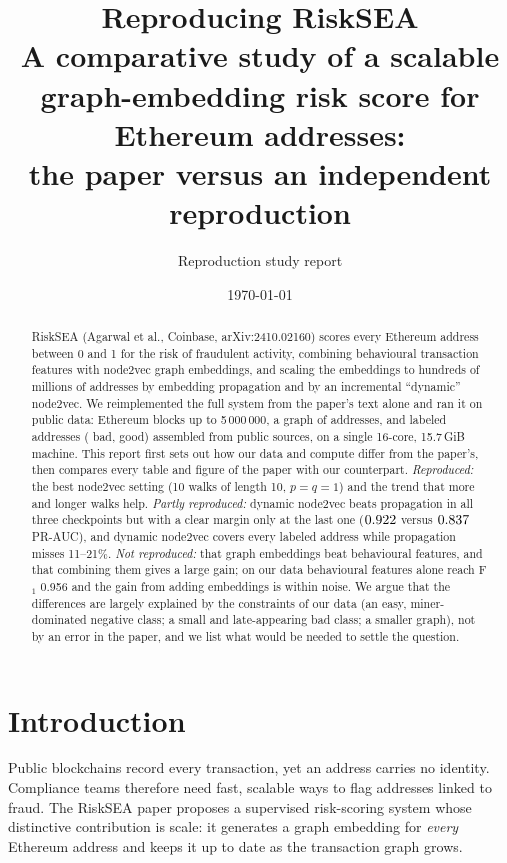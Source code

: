 \documentclass[11pt,a4paper]{article}
\title{\textbf{Reproducing RiskSEA}\\[2pt]\large A comparative study of a scalable graph-embedding risk score for Ethereum addresses:\\ the paper versus an independent reproduction}
\author{Reproduction study report}
\date{\today}
\begin{document}
\maketitle

\begin{abstract}
\noindent
RiskSEA (Agarwal et al., Coinbase, arXiv:2410.02160) scores every Ethereum address between 0 and 1 for the risk of fraudulent activity, combining behavioural transaction features with node2vec graph embeddings, and scaling the embeddings to hundreds of millions of addresses by embedding propagation and by an incremental ``dynamic'' node2vec. We reimplemented the full system from the paper's text alone and ran it on public data: Ethereum blocks up to 5\,000\,000, a graph of \NumNodes{} addresses, and \NumLabeled{} labeled addresses (\NumBad{} bad, \NumGood{} good) assembled from public sources, on a single 16-core, 15.7\,GiB machine. This report first sets out how our data and compute differ from the paper's, then compares every table and figure of the paper with our counterpart.
\emph{Reproduced:} the best node2vec setting (10 walks of length 10, $p=q=1$) and the trend that more and longer walks help. \emph{Partly reproduced:} dynamic node2vec beats propagation in all three checkpoints but with a clear margin only at the last one ($0.922$ versus $0.837$ PR-AUC), and dynamic node2vec covers every labeled address while propagation misses 11--21\%. \emph{Not reproduced:} that graph embeddings beat behavioural features, and that combining them gives a large gain; on our data behavioural features alone reach F$_1$ 0.956 and the gain from adding embeddings is within noise. We argue that the differences are largely explained by the constraints of our data (an easy, miner-dominated negative class; a small and late-appearing bad class; a smaller graph), not by an error in the paper, and we list what would be needed to settle the question.
\end{abstract}

\tableofcontents
\clearpage

\section{Introduction}
Public blockchains record every transaction, yet an address carries no identity. Compliance teams therefore need fast, scalable ways to flag addresses linked to fraud. The RiskSEA paper proposes a supervised risk-scoring system whose distinctive contribution is scale: it generates a graph embedding for \emph{every} Ethereum address and keeps it up to date as the transaction graph grows.
\end{document}
